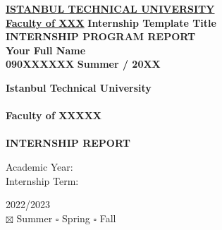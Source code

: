 \documentclass[12pt]{article}
\newcommand{\name}{Your Full Name}
\newcommand{\id}{090XXXXXX}
\begin{document}

\begin{titlepage}
  \centering
  \underline{\bfseries ISTANBUL TECHNICAL UNIVERSITY} \\
  \underline{\bfseries Faculty of XXX}
  \vfill
      {\bfseries Internship Template Title} \\
      \vfill
          {\fontsize{25}{30}\bfseries INTERNSHIP PROGRAM REPORT} \\
          \vspace{0.4cm}
          {\bfseries \name} \\
          {\bfseries \id}
      \vfill
  {\bfseries Summer / 20XX}
  
\end{titlepage}

{\centering
{\bfseries Istanbul Technical University} \\
\hspace{0.1cm}\\
{\bfseries Faculty of XXXXX} \\
\hspace{0.1cm}\\
{\bfseries INTERNSHIP REPORT} \\[1\baselineskip] \par}
\begin{minipage}[t]{.3\textwidth}
  \begin{flushright}
    Academic Year: \\
    Internship Term:
  \end{flushright}
\end{minipage}%
\hspace{0.5cm}
\begin{minipage}[t]{.7\textwidth}
  2022/2023 \\
  $\boxtimes$ Summer  $\square$ Spring  $\square$ Fall \\ 
\end{minipage}
\end{document}
